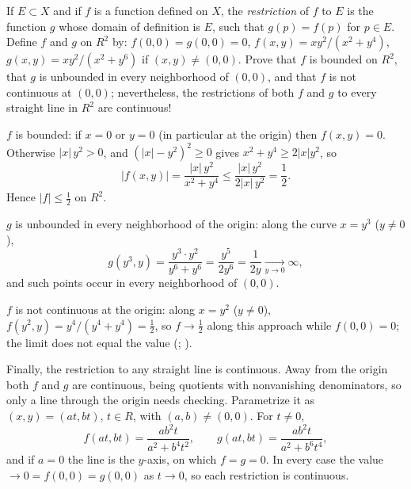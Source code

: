 \documentclass[main.tex]{subfiles}
\begin{document}
If $E \subset X$ and if $f$ is a function defined on $X$, the \textit{restriction} of $f$ to $E$ is the function $g$ whose domain of definition is $E$, such that $g(p) = f(p)$ for $p \in E$. Define $f$ and $g$ on $R^{2}$ by: $f(0,0) = g(0,0) = 0$, $f(x,y) = xy^{2}/(x^{2} + y^{4})$, $g(x,y) = xy^{2}/(x^{2} + y^{6})$ if $(x,y) \neq (0,0)$. Prove that $f$ is bounded on $R^{2}$, that $g$ is unbounded in every neighborhood of $(0,0)$, and that $f$ is not continuous at $(0,0)$; nevertheless, the restrictions of both $f$ and $g$ to every straight line in $R^{2}$ are continuous!
\begin{Solution}
$f$ is bounded: if $x = 0$ or $y = 0$ (in particular at the origin) then $f(x,y) = 0$. Otherwise $|x|\,y^{2} > 0$, and $(|x| - y^{2})^{2} \ge 0$ gives $x^{2} + y^{4} \ge 2|x|y^{2}$, so
\[
|f(x,y)| = \frac{|x|\,y^{2}}{x^{2} + y^{4}} \le \frac{|x|\,y^{2}}{2|x|\,y^{2}} = \frac{1}{2}.
\]
Hence $|f| \le \tfrac{1}{2}$ on $R^{2}$.

$g$ is unbounded in every neighborhood of the origin: along the curve $x = y^{3}$ ($y \ne 0$),
\[
g(y^{3}, y) = \frac{y^{3}\cdot y^{2}}{y^{6} + y^{6}} = \frac{y^{5}}{2y^{6}} = \frac{1}{2y} \xrightarrow[y \to 0]{} \infty,
\]
and such points occur in every neighborhood of $(0,0)$.

$f$ is not continuous at the origin: along $x = y^{2}$ ($y \ne 0$), $f(y^{2}, y) = y^{4}/(y^{4} + y^{4}) = \tfrac{1}{2}$, so $f \to \tfrac{1}{2}$ along this approach while $f(0,0) = 0$; the limit does not equal the value (; ).

Finally, the restriction to any straight line is continuous. Away from the origin both $f$ and $g$ are continuous, being quotients with nonvanishing denominators, so only a line through the origin needs checking. Parametrize it as $(x, y) = (at, bt)$, $t \in R$, with $(a,b) \ne (0,0)$. For $t \ne 0$,
\[
f(at, bt) = \frac{ab^{2}t}{a^{2} + b^{4}t^{2}}, \qquad g(at, bt) = \frac{ab^{2}t}{a^{2} + b^{6}t^{4}},
\]
and if $a = 0$ the line is the $y$-axis, on which $f = g = 0$. In every case the value $\to 0 = f(0,0) = g(0,0)$ as $t \to 0$, so each restriction is continuous.
\end{Solution}
\end{document}

